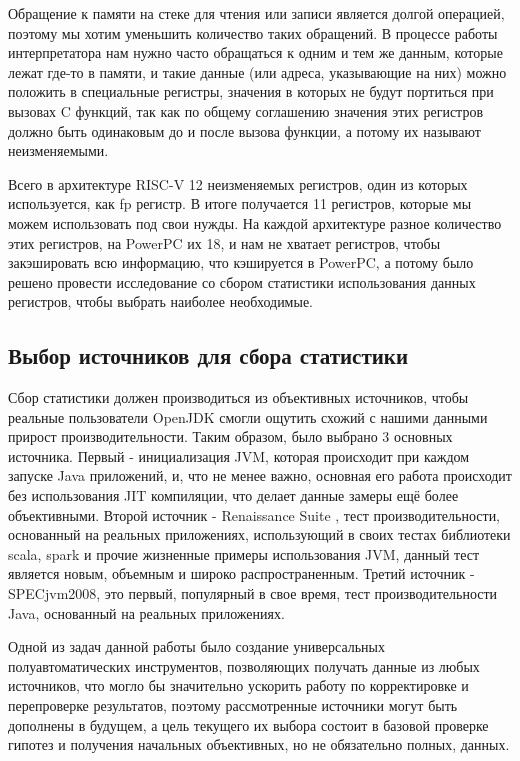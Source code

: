 \newpage
{}

Обращение к памяти на стеке для чтения или записи является долгой операцией, поэтому мы хотим уменьшить количество таких обращений. В процессе работы интерпретатора нам нужно часто обращаться к одним и тем же данным, которые лежат где-то в памяти, и такие данные (или адреса, указывающие на них) можно положить в специальные регистры, значения в которых не будут портиться при вызовах C функций, так как по общему соглашению значения этих регистров должно быть одинаковым до и после вызова функции, а потому их называют неизменяемыми.

Всего в архитектуре RISC-V 12 неизменяемых регистров, один из которых используется, как fp регистр. В итоге получается 11 регистров, которые мы можем использовать под свои нужды. На каждой архитектуре разное количество этих регистров, на PowerPC их 18, и нам не хватает регистров, чтобы закэшировать всю информацию, что кэшируется в PowerPC, а потому было решено провести исследование со сбором статистики использования данных регистров, чтобы выбрать наиболее необходимые.



\subsection{Выбор источников для сбора статистики}

Сбор статистики должен производиться из объективных источников, чтобы реальные пользователи OpenJDK смогли ощутить схожий с нашими данными прирост производительности. Таким образом, было выбрано 3 основных источника.
Первый - инициализация JVM, которая происходит при каждом запуске Java приложений, и, что не менее важно, основная его работа происходит без использования JIT компиляции, что делает данные замеры ещё более объективными.
Второй источник - Renaissance Suite \cite{renaissance}, тест производительности, основанный на реальных приложениях, использующий в своих тестах библиотеки scala, spark и прочие жизненные примеры использования JVM, данный тест является новым, объемным и широко распространенным.
Третий источник - SPECjvm2008, это первый, популярный в свое время, тест производительности Java, основанный на реальных приложениях.

Одной из задач данной работы было создание универсальных полуавтоматических инструментов, позволяющих получать данные из любых источников, что могло бы значительно ускорить работу по корректировке и перепроверке результатов, поэтому рассмотренные источники могут быть дополнены в будущем, а цель текущего их выбора состоит в базовой проверке гипотез и получения начальных объективных, но не обязательно полных, данных. 



